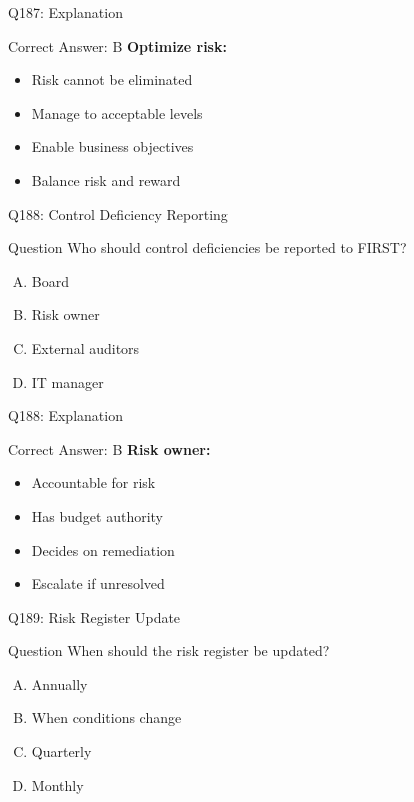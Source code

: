 \documentclass{beamer}
\begin{document}
	\begin{frame}{Q187: Explanation}
		\begin{block}{Correct Answer: B}
			\textbf{Optimize risk:}
			\begin{itemize}
				\item Risk cannot be eliminated
				\item Manage to acceptable levels
				\item Enable business objectives
				\item Balance risk and reward
			\end{itemize}
		\end{block}
	\end{frame}
	
	\begin{frame}{Q188: Control Deficiency Reporting}
		\begin{block}{Question}
			Who should control deficiencies be reported to FIRST?
		\end{block}
		\begin{enumerate}[(A)]
			\item Board
			\item Risk owner
			\item External auditors
			\item IT manager
		\end{enumerate}
	\end{frame}
	
	\begin{frame}{Q188: Explanation}
		\begin{block}{Correct Answer: B}
			\textbf{Risk owner:}
			\begin{itemize}
				\item Accountable for risk
				\item Has budget authority
				\item Decides on remediation
				\item Escalate if unresolved
			\end{itemize}
		\end{block}
	\end{frame}
	
	\begin{frame}{Q189: Risk Register Update}
		\begin{block}{Question}
			When should the risk register be updated?
		\end{block}
		\begin{enumerate}[(A)]
			\item Annually
			\item When conditions change
			\item Quarterly
			\item Monthly
		\end{enumerate}
	\end{frame}
	
\end{document}
